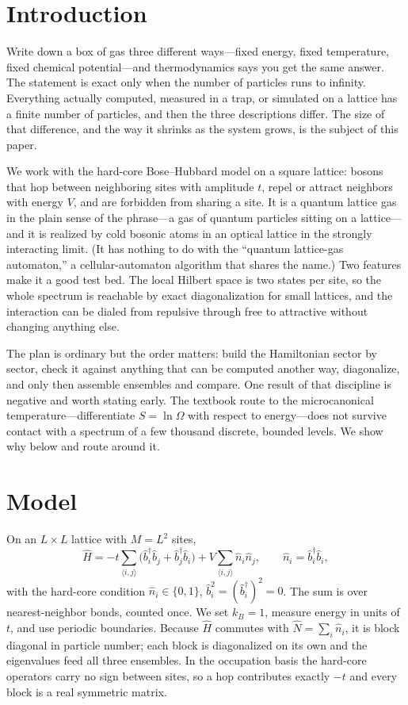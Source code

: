 \documentclass[twocolumn,10pt]{article}
\newcommand{\bd}{\hat b^\dagger}
\begin{document}
\section{Introduction}
Write down a box of gas three different ways---fixed energy, fixed temperature,
fixed chemical potential---and thermodynamics says you get the same answer. The
statement is exact only when the number of particles runs to infinity. Everything
actually computed, measured in a trap, or simulated on a lattice has a finite
number of particles, and then the three descriptions differ. The size of that
difference, and the way it shrinks as the system grows, is the subject of this
paper.

We work with the hard-core Bose--Hubbard model on a square lattice: bosons that
hop between neighboring sites with amplitude $t$, repel or attract neighbors with
energy $V$, and are forbidden from sharing a site. It is a quantum lattice gas in
the plain sense of the phrase---a gas of quantum particles sitting on a
lattice---and it is realized by cold bosonic atoms in an optical lattice in the
strongly interacting limit. (It has nothing to do with the ``quantum lattice-gas
automaton,'' a cellular-automaton algorithm that shares the name.) Two features
make it a good test bed. The local Hilbert space is two states per site, so the
whole spectrum is reachable by exact diagonalization for small lattices, and the
interaction can be dialed from repulsive through free to attractive without
changing anything else.

The plan is ordinary but the order matters: build the Hamiltonian sector by
sector, check it against anything that can be computed another way, diagonalize,
and only then assemble ensembles and compare. One result of that discipline is
negative and worth stating early. The textbook route to the microcanonical
temperature---differentiate $S=\ln\Omega$ with respect to energy---does not
survive contact with a spectrum of a few thousand discrete, bounded levels. We
show why below and route around it.

\section{Model}
On an $L\times L$ lattice with $M=L^2$ sites,
\begin{equation}
\hat H=-t\!\sum_{\langle i,j\rangle}\!\big(\bd_i \hat b_j+\bd_j \hat b_i\big)
+V\!\sum_{\langle i,j\rangle}\!\hat n_i \hat n_j,
\qquad \hat n_i=\bd_i\hat b_i,
\end{equation}
with the hard-core condition $\hat n_i\in\{0,1\}$, $\hat b_i^2=(\bd_i)^2=0$. The
sum is over nearest-neighbor bonds, counted once. We set $k_B=1$, measure energy
in units of $t$, and use periodic boundaries. Because $\hat H$ commutes with
$\hat N=\sum_i\hat n_i$, it is block diagonal in particle number; each block is
diagonalized on its own and the eigenvalues feed all three ensembles. In the
occupation basis the hard-core operators carry no sign between sites, so a hop
contributes exactly $-t$ and every block is a real symmetric matrix.
\end{document}
